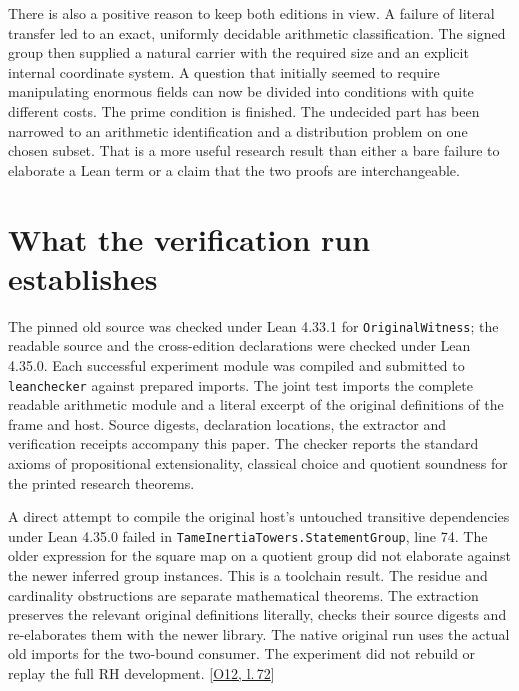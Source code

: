 \documentclass[12pt,letterpaper]{article}
\newcommand{\id}[1]{{\small\nolinkurl{#1}}}
\begin{document}
There is also a positive reason to keep both editions in view. A failure of literal transfer led to an exact, uniformly decidable arithmetic classification. The signed group then supplied a natural carrier with the required size and an explicit internal coordinate system. A question that initially seemed to require manipulating enormous fields can now be divided into conditions with quite different costs. The prime condition is finished. The undecided part has been narrowed to an arithmetic identification and a distribution problem on one chosen subset. That is a more useful research result than either a bare failure to elaborate a Lean term or a claim that the two proofs are interchangeable.

\section{What the verification run establishes}
The pinned old source was checked under Lean 4.33.1 for \id{OriginalWitness}; the readable source and the cross-edition declarations were checked under Lean 4.35.0. Each successful experiment module was compiled and submitted to \id{leanchecker} against prepared imports. The joint test imports the complete readable arithmetic module and a literal excerpt of the original definitions of the frame and host. Source digests, declaration locations, the extractor and verification receipts accompany this paper. The checker reports the standard axioms of propositional extensionality, classical choice and quotient soundness for the printed research theorems.

A direct attempt to compile the original host's untouched transitive dependencies under Lean 4.35.0 failed in \id{TameInertiaTowers.StatementGroup}, line 74. The older expression for the square map on a quotient group did not elaborate against the newer inferred group instances. This is a toolchain result. The residue and cardinality obstructions are separate mathematical theorems. The extraction preserves the relevant original definitions literally, checks their source digests and re-elaborates them with the newer library. The native original run uses the actual old imports for the two-bound consumer. The experiment did not rebuild or replay the full RH development. {\footnotesize\sffamily\color{mute}[\href{https://github.com/nousentllc/riemann-hypothesis/blob/40e56bab026552e089d7afcfeff08d2defb9c005/src/Formalism/TameInertiaTowers/StatementGroup.lean\#L72}{O12, l.\,72}]}
\end{document}
